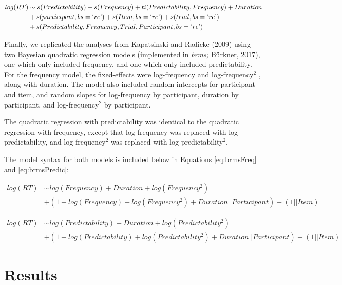 \documentclass[
  man,floatsintext]{apa6}
\begin{document}
\begin{equation}
\begin{aligned}
\label{eq:gammFull}
log(RT) & \sim s(Predictability) + s(Frequency) + ti (Predictability, Frequency) + Duration \\ & + s(participant, bs = `re\text{'}) + s(Item, bs = `re\text{'})  
+ s(trial, bs = `re\text{'}) \\ & + s(Predictability, Frequency, Trial, Participant, bs = `re\text{'}) 
\end{aligned}
\end{equation}

Finally, we replicated the analyses from Kapatsinski and Radicke (2009) using two Bayesian quadratic regression models (implemented in \emph{brms;} Bürkner, 2017), one which only included frequency, and one which only included predictability. For the frequency model, the fixed-effects were log-frequency and log-frequency\(^2\) , along with duration. The model also included random intercepts for participant and item, and random slopes for log-frequency by participant, duration by participant, and log-frequency\(^2\) by participant.

The quadratic regression with predictability was identical to the quadratic regression with frequency, except that log-frequency was replaced with log-predictability, and log-frequency\(^2\) was replaced with log-predictability\(^2\).

The model syntax for both models is included below in Equations \eqref{eq:brmsFreq} and \eqref{eq:brmsPredic}:

\begin{equation}
\begin{aligned}
\label{eq:brmsFreq}
log(RT) & \sim log(Frequency) + Duration + log(Frequency^2) \\ & + (1 + log(Frequency) + log(Frequency^2) + Duration || Participant) + (1 || Item)
\end{aligned}
\end{equation}

\begin{equation}
\begin{aligned}
\label{eq:brmsPredic}
log(RT) & \sim  log(Predictability) + Duration + log(Predictability^2) \\ & + (1 + log(Predictability) + log(Predictability^2) + Duration || Participant) + (1 || Item)
\end{aligned}
\end{equation}

\section{Results}\label{results}
\end{document}
